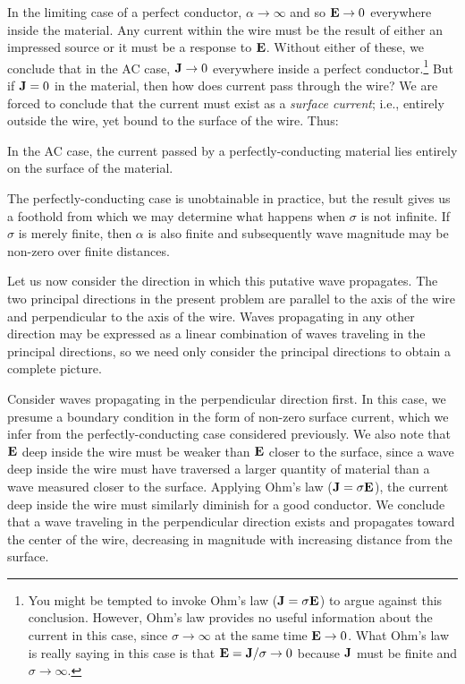 In the limiting case of a perfect conductor, 
$\alpha\to\infty$ and so ${\bf E}\to 0$ everywhere inside the material.
Any current within the wire must be the result of either an impressed source or it must be a response to ${\bf E}$.  
Without either of these, we conclude that in the AC case, ${\bf J}\to 0$ everywhere inside a perfect conductor.\footnote{You might be tempted to invoke Ohm's law (${\bf J}=\sigma{\bf E}$) to argue against this conclusion.  However, Ohm's law provides no useful information about the current in this case, since $\sigma\to\infty$ at the same time ${\bf E}\to 0$.  What Ohm's law is really saying in this case is that ${\bf E}={\bf J}/\sigma\to 0$ because ${\bf J}$ must be finite and $\sigma\to\infty$.}
But if ${\bf J}=0$ in the material, then how does current pass through the wire?
We are forced to conclude that the current must exist as a \emph{surface current}; i.e., entirely outside the wire, yet bound to the surface of the wire.
Thus:
%
\begin{mdframed}[backgroundcolor=yellow!20,nobreak=true] 
In the AC case, the current passed by a perfectly-conducting material lies entirely on the surface of the material.  
\end{mdframed}

The perfectly-conducting case is unobtainable in practice, but the result gives us a foothold from which we may determine what happens when $\sigma$ is not infinite.
If $\sigma$ is merely finite, then $\alpha$ is also finite and subsequently wave magnitude may be non-zero over finite distances.

Let us now consider the direction in which this putative wave propagates.
The two principal directions in the present problem are parallel to the axis of the wire and perpendicular to the axis of the wire.
Waves propagating in any other direction may be expressed as a linear combination of waves traveling in the principal directions, so we need only consider the principal directions to obtain a complete picture.

Consider waves propagating in the perpendicular direction first.
In this case, we presume a boundary condition in the form of non-zero surface current, which we infer from the perfectly-conducting case considered previously.
We also note that ${\bf E}$ deep inside the wire must be weaker than ${\bf E}$ closer to the surface, since a wave deep inside the wire must have traversed a larger quantity of material than a wave measured closer to the surface.
Applying Ohm's law (${\bf J}=\sigma{\bf E}$), the current deep inside the wire must similarly diminish for a good conductor.
We conclude that a wave traveling in the perpendicular direction exists and propagates toward the center of the wire, decreasing in magnitude with increasing distance from the surface.


